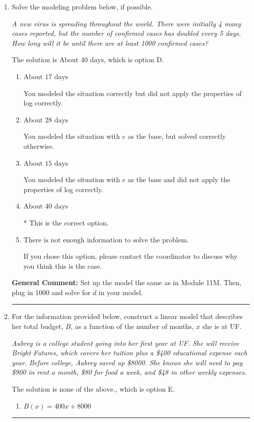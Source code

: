 \documentclass{extbook}[14pt]
\newcommand{\litem}[1]{\item #1

\rule{\textwidth}{0.4pt}}
\begin{document}
\begin{enumerate}\litem{
Solve the modeling problem below, if possible.

\begin{center}
    \textit{ A new virus is spreading throughout the world. There were initially 4 many cases reported, but the number of confirmed cases has doubled every 5 days. How long will it be until there are at least 1000 confirmed cases? }
\end{center}
The solution is \( \text{About } 40 \text{ days} \), which is option D.\begin{enumerate}[label=\Alph*.]
\item \( \text{About } 17 \text{ days} \)

You modeled the situation correctly but did not apply the properties of log correctly.
\item \( \text{About } 28 \text{ days} \)

You modeled the situation with $e$ as the base, but solved correctly otherwise.
\item \( \text{About } 15 \text{ days} \)

You modeled the situation with $e$ as the base and did not apply the properties of log correctly.
\item \( \text{About } 40 \text{ days} \)

* This is the correct option.
\item \( \text{There is not enough information to solve the problem.} \)

If you chose this option, please contact the coordinator to discuss why you think this is the case.
\end{enumerate}

\textbf{General Comment:} Set up the model the same as in Module 11M. Then, plug in 1000 and solve for $d$ in your model.
}
\litem{
For the information provided below, construct a linear model that describes her total budget, $B$, as a function of the number of months, $x$ she is at UF.

\begin{center}
    \textit{ Aubrey is a college student going into her first year at UF. She will receive Bright Futures, which covers her tuition plus a \$400 educational expense each year. Before college, Aubrey saved up \$8000. She knows she will need to pay \$900 in rent a month, \$80 for food a week, and \$48 in other weekly expenses. }
\end{center}
The solution is \( \text{none of the above.} \), which is option E.\begin{enumerate}[label=\Alph*.]
\item \( B(x) = 400 x + 8000 \)


\end{enumerate}}
\end{enumerate}
\end{document}
